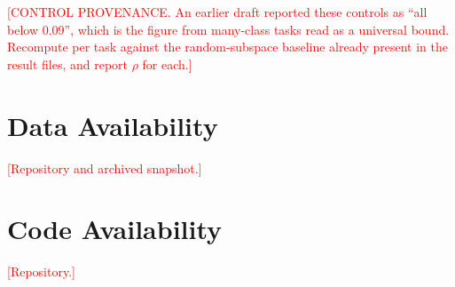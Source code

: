 \documentclass[11pt]{article}
\newcommand{\TODO}[1]{\textcolor{red}{[#1]}}
\begin{document}
\TODO{CONTROL PROVENANCE. An earlier draft reported these controls as ``all below
$0.09$'', which is the figure from many-class tasks read as a universal bound.
Recompute per task against the random-subspace baseline already present in the
result files, and report $\rho$ for each.}

\section*{Data Availability}

\TODO{Repository and archived snapshot.}

\section*{Code Availability}

\TODO{Repository.}



\end{document}
